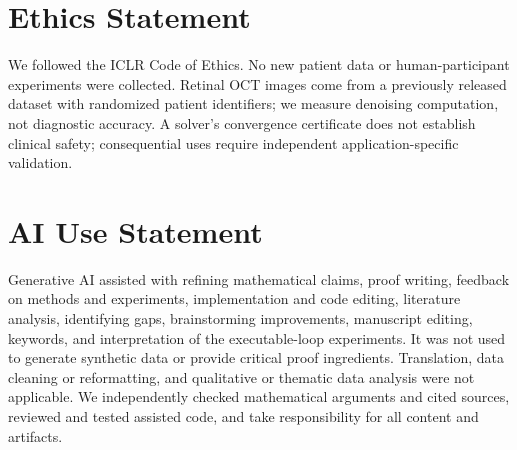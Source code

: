 \documentclass{article}
\theoremstyle{definition}
\theoremstyle{remark}
\begin{document}
\section*{Ethics Statement}
We followed the ICLR Code of Ethics. No new patient data or human-participant
experiments were collected. Retinal OCT images come from a previously released
dataset with randomized patient identifiers; we measure denoising computation,
not diagnostic accuracy. A solver's convergence certificate does not establish
clinical safety; consequential uses require independent application-specific
validation.

\section*{AI Use Statement}
Generative AI assisted with refining mathematical claims, proof writing,
feedback on methods and experiments, implementation and code editing,
literature analysis, identifying gaps, brainstorming improvements, manuscript
editing, keywords, and interpretation of the executable-loop experiments. It
was not used to generate synthetic data or provide critical proof ingredients.
Translation, data cleaning or reformatting,
and qualitative or thematic data analysis were not applicable.
We independently checked mathematical arguments and cited sources, reviewed
and tested assisted code, and take responsibility for all content and artifacts.





\appendix





\clearpage



% 
\end{document}
